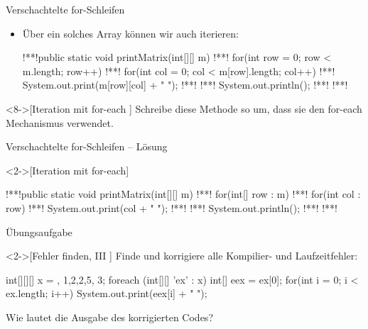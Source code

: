 \begin{frame}[fragile]{Verschachtelte for-Schleifen}
    \begin{itemize}[<+(1)->]
        \widei
        \item Über ein solches Array können wir auch iterieren:\pause{}
\begin{plainjava}
!**!public static void printMatrix(int[][] m){
!**!    for(int row = 0; row < m.length; row++) {
!**!        for(int col = 0; col < m[row].length; col++) {
!**!            System.out.print(m[row][col] + " ");
!**!        }
!**!        System.out.println();
!**!    }
!**!}
\end{plainjava}
    \end{itemize}
\ifull
    \begin{exercise}<8->[Iteration mit for-each ]
        Schreibe diese Methode so um, dass sie den for-each Mechanismus verwendet.
    \end{exercise}
\fi
\end{frame}

\ifull
\begin{frame}[c,fragile]{Verschachtelte for-Schleifen -- Lösung}
    \begin{solve}<2->[Iteration mit for-each]
\begin{plainjava}
!**!public static void printMatrix(int[][] m){
!**!    for(int[] row : m) {
!**!        for(int col : row) {
!**!            System.out.print(col + " ");
!**!        }
!**!        System.out.println();
!**!    }
!**!}
\end{plainjava}
    \end{solve}
\end{frame}
\fi

\ifull
\begin{frame}[c,fragile]{Übungsaufgabe}
    \begin{exercise}<2->[Fehler finden, III ]
        \pause{}Finde und korrigiere alle Kompilier- und Laufzeitfehler:\pause{}
        \begin{plainvoid}
int[][][] x = {{}, {{1,2},{2},{5}}, {{3}}};
foreach (int[][] 'ex' : x) {
    int[] eex = ex[0];
    for(int i = 0; i < ex.length; i++)
        System.out.print(eex[i] + " ");
}
        \end{plainvoid}
        \pause{}Wie lautet die Ausgabe des korrigierten Codes?
    \end{exercise}
\end{frame}

